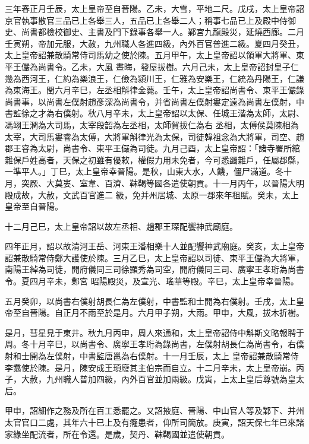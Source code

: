 \begin{pinyinscope}
 三年春正月壬辰，太上皇帝至自晉陽。乙未，大雪，平地二尺。戊戌，太上皇帝詔京官執事散官三品已上各舉三人，五品已上各舉二人；稱事七品已上及殿中侍御史、尚書都檢校御史、主書及門下錄事各舉一人。鄴宮九龍殿災，延燒西廊。二月壬寅朔，帝加元服，大赦，九州職人各進四級，內外百官普進二級。夏四月癸丑，太上皇帝詔兼散騎常侍司馬幼之使於陳。五月甲午，太上皇帝詔以領軍大將軍、東平王儼為尚書令。乙未，大風
 晝晦，發屋拔樹。六月己未，太上皇帝詔封皇子仁幾為西河王，仁約為樂浪王，仁儉為潁川王，仁雅為安樂王，仁統為丹陽王，仁謙為東海王。閏六月辛巳，左丞相斛律金薨。壬午，太上皇帝詔尚書令、東平王儼錄尚書事，以尚書左僕射趙彥深為尚書令，并省尚書左僕射婁定遠為尚書左僕射，中書監徐之才為右僕射。秋八月辛未，太上皇帝詔以太保、任城王湝為太師，太尉、馮翊王潤為大司馬，太宰段韶為左丞相，太師賀拔仁為右
 丞相，太傅侯莫陳相為太宰，大司馬婁睿為太傅，大將軍斛律光為太保，司徒韓祖念為大將軍，司空、趙郡王睿為太尉，尚書令、東平王儼為司徒。九月己酉，太上皇帝詔：「諸寺署所綰雜保戶姓高者，天保之初雖有優敕，權假力用未免者，今可悉蠲雜戶，任屬郡縣，一準平人。」丁巳，太上皇帝幸晉陽。是秋，山東大水，人饑，僵尸滿道。冬十月，突厥、大莫婁、室韋、百濟、靺鞨等國各遣使朝貢。十一月丙午，以晉陽大明殿成故，大赦，文武百官進二
 級，免并州居城、太原一郡來年租賦。癸未，太上皇帝至自晉陽。



 十二月己巳，太上皇帝詔以故左丞相、趙郡王琛配饗神武廟庭。



 四年正月，詔以故清河王岳、河東王潘相樂十人並配饗神武廟庭。癸亥，太上皇帝詔兼散騎常侍鄭大護使於陳。三月乙巳，太上皇帝詔以司徒、東平王儼為大將軍，南陽王綽為司徒，開府儀同三司徐顯秀為司空，開府儀同三司、廣寧王孝珩為尚書令。夏四月辛未，鄴宮
 昭陽殿災，及宣光、瑤華等殿。辛巳，太上皇帝幸晉陽。



 五月癸卯，以尚書右僕射胡長仁為左僕射，中書監和士開為右僕射。壬戌，太上皇帝至自晉陽。自正月不雨至於是月。六月甲子朔，大雨。甲申，大風，拔木折樹。



 是月，彗星見于東井。秋九月丙申，周人來通和，太上皇帝詔侍中斛斯文略報聘于周。冬十月辛巳，以尚書令、廣寧王孝珩為錄尚書，左僕射胡長仁為尚書令，右僕射和士開為左僕射，中書監唐邕為右僕射。十一月壬辰，太上
 皇帝詔兼散騎常侍李翥使於陳。是月，陳安成王頊廢其主伯宗而自立。十二月辛未，太上皇帝崩。丙子，大赦，九州職人普加四級，內外百官並加兩級。戊寅，上太上皇后尊號為皇太后。



 甲申，詔細作之務及所在百工悉罷之。又詔掖庭、晉陽、中山官人等及鄴下、并州太官官口二處，其年六十已上及有癃患者，仰所司簡放。庚寅，詔天保七年已來諸家緣坐配流者，所在令還。是歲，契丹、靺鞨國並遣使朝貢。




\end{pinyinscope}
